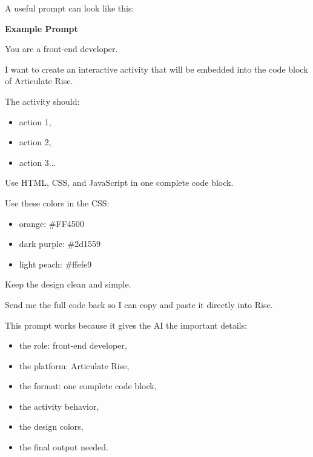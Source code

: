 \documentclass{article}
\begin{document}
A useful prompt can look like this:

\begin{attentionbox}
  \textbf{\Bitter\textcolor{naranja}{Example Prompt}}

  You are a front-end developer.

  I want to create an interactive activity that will be embedded into the code block of Articulate Rise.

  The activity should:

  \begin{itemize}[leftmargin=1.2cm, itemsep=3pt]
    \item action 1,
    \item action 2,
    \item action 3...
  \end{itemize}

  Use HTML, CSS, and JavaScript in one complete code block.

  Use these colors in the CSS:

  \begin{itemize}[leftmargin=1.2cm, itemsep=3pt]
    \item orange: \#FF4500
    \item dark purple: \#2d1559
    \item light peach: \#ffefe9
  \end{itemize}

  Keep the design clean and simple.

  Send me the full code back so I can copy and paste it directly into Rise.
\end{attentionbox}

\vspace{0.3cm}

This prompt works because it gives the AI the important details:

\begin{itemize}[leftmargin=1.2cm, itemsep=4pt]
  \item the role: front-end developer,
  \item the platform: Articulate Rise,
  \item the format: one complete code block,
  \item the activity behavior,
  \item the design colors,
  \item the final output needed.
\end{itemize}

\vspace{0.4cm}
\end{document}
